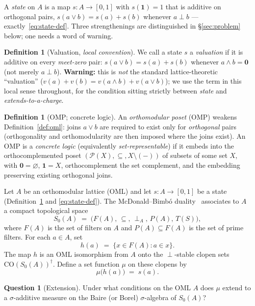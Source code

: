 \documentclass[11pt]{article}
\theoremstyle{definition}
\newtheorem{definition}[theorem]{Definition}
\newtheorem{question}[theorem]{Question}
\newcommand{\CO}{\mathrm{CO}}
\begin{document}
A \emph{state} on $A$ is a map $s : A \to [0,1]$ with $s(\mathbf 1)=1$
that is additive on orthogonal pairs, $s(a \vee b)=s(a)+s(b)$ whenever
$a \perp b$ --- exactly~\eqref{eq:state-def}. Three strengthenings are
distinguished in \S\ref{sec:problem} below; one needs a word of warning.

\begin{definition}[Valuation, \emph{local convention}]\label{def:valuation}
We call a state $s$ a \emph{valuation} if it is additive on every
\emph{meet-zero} pair: $s(a \vee b)=s(a)+s(b)$ whenever
$a \wedge b = \mathbf 0$ (not merely $a \perp b$). \textbf{Warning:}
this is \emph{not} the standard lattice-theoretic ``valuation''
($v(a)+v(b)=v(a\wedge b)+v(a\vee b)$); we use the term in this local
sense throughout, for the condition sitting strictly between
\emph{state} and \emph{extends-to-a-charge}.
\end{definition}

\begin{definition}[OMP; concrete logic]\label{def:omp}
An \emph{orthomodular poset} (OMP) weakens
Definition~\ref{def:oml}: joins $a \vee b$ are required to exist only
for \emph{orthogonal} pairs (orthogonality and orthomodularity are then
imposed where the joins exist). An OMP is a \emph{concrete logic}
(equivalently \emph{set-representable}) if it embeds into the
orthocomplemented poset $(\mathcal P(X), \subseteq, X \setminus(-))$ of
subsets of some set $X$, with $\mathbf 0=\varnothing$,
$\mathbf 1 = X$, orthocomplement the set complement, and the embedding
preserving existing orthogonal joins.
\end{definition}

\medskip
Let $A$ be an orthomodular lattice (OML) and let $s : A \to [0,1]$
be a state (Definition~\ref{def:valuation} and
\eqref{eq:state-def}).  The McDonald--Bimb\'{o}
duality~\cite{McDonaldBimbo2023} associates to $A$ a compact
topological space
\[
  S_0(A) \;=\; \bigl(F(A),\, \subseteq,\, \perp_A,\, P(A),\,
  T(S)\bigr),
\]
where $F(A)$ is the set of filters on $A$ and
$P(A) \subseteq F(A)$ is the set of prime filters.  For each
$a \in A$, set
\[
  h(a) \;=\; \{x \in F(A) : a \in x\}.
\]
The map $h$ is an OML isomorphism from $A$ onto the
$\perp$-stable clopen sets $\CO(S_0(A))^\dagger$.  Define a set
function $\mu$ on these clopens by
\begin{equation}\label{eq:mu-def}
  \mu\bigl(h(a)\bigr) \;=\; s(a).
\end{equation}

\begin{question}[Extension]\label{q:extension}
Under what conditions on the OML $A$ does $\mu$ extend to a
$\sigma$-additive measure on the Baire (or Borel) $\sigma$-algebra
of $S_0(A)$?
\end{question}
\end{document}
